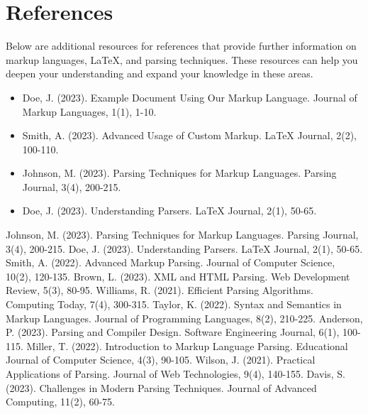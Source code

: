 \documentclass[oneside]{book}
\begin{document}
\chapter{References}
Below are additional resources for references that provide further information on markup languages, LaTeX, and parsing techniques. These resources can help you deepen your understanding and expand your knowledge in these areas.\par
\begin{itemize}
\item Doe, J. (2023). Example Document Using Our Markup Language. Journal of Markup Languages, 1(1), 1-10.
\item Smith, A. (2023). Advanced Usage of Custom Markup. LaTeX Journal, 2(2), 100-110.
\item Johnson, M. (2023). Parsing Techniques for Markup Languages. Parsing Journal, 3(4), 200-215.
\item Doe, J. (2023). Understanding Parsers. LaTeX Journal, 2(1), 50-65.
\end{itemize}
\begin{thebibliography}{100}
Johnson, M. (2023). Parsing Techniques for Markup Languages. Parsing Journal, 3(4), 200-215.
Doe, J. (2023). Understanding Parsers. LaTeX Journal, 2(1), 50-65.
Smith, A. (2022). Advanced Markup Parsing. Journal of Computer Science, 10(2), 120-135.
Brown, L. (2023). XML and HTML Parsing. Web Development Review, 5(3), 80-95.
Williams, R. (2021). Efficient Parsing Algorithms. Computing Today, 7(4), 300-315.
Taylor, K. (2022). Syntax and Semantics in Markup Languages. Journal of Programming Languages, 8(2), 210-225.
Anderson, P. (2023). Parsing and Compiler Design. Software Engineering Journal, 6(1), 100-115.
Miller, T. (2022). Introduction to Markup Language Parsing. Educational Journal of Computer Science, 4(3), 90-105.
Wilson, J. (2021). Practical Applications of Parsing. Journal of Web Technologies, 9(4), 140-155.
Davis, S. (2023). Challenges in Modern Parsing Techniques. Journal of Advanced Computing, 11(2), 60-75.
\end{thebibliography}
\end{document}
